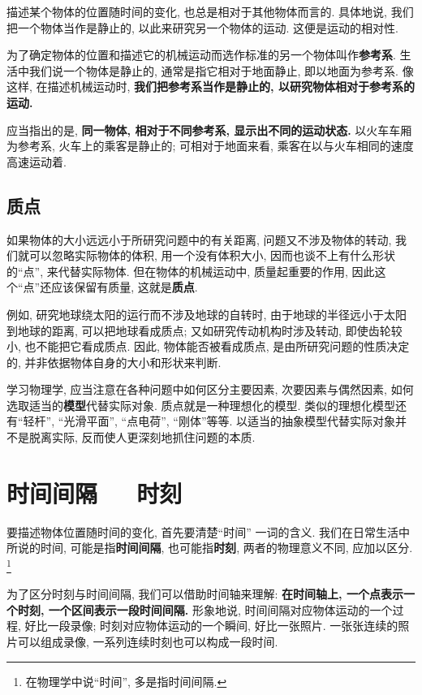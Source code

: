 \documentclass[11pt,a4paper]{ctexbook}
\newcommand{\bre}{\ \ \ }
\begin{document}
描述某个物体的位置随时间的变化, 也总是相对于其他物体而言的. 具体地说,
我们把一个物体当作是静止的, 以此来研究另一个物体的运动. 这便是运动的相对性.

为了确定物体的位置和描述它的机械运动而选作标准的另一个物体叫作\textbf{参考系}.
生活中我们说一个物体是静止的, 通常是指它相对于地面静止, 即以地面为参考系.
像这样, 在描述机械运动时, \textbf{我们把参考系当作是静止的, 以研究物体相对于参考系的运动.}

应当指出的是, \textbf{同一物体, 相对于不同参考系, 显示出不同的运动状态.}
以火车车厢为参考系, 火车上的乘客是静止的; 可相对于地面来看, 乘客在以与火车相同的速度高速运动着.

\subsection{质点}

如果物体的大小远远小于所研究问题中的有关距离, 问题又不涉及物体的转动,
我们就可以忽略实际物体的体积, 用一个没有体积大小, 因而也谈不上有什么形状的``点'', 来代替实际物体.
但在物体的机械运动中, 质量起重要的作用, 因此这个``点''还应该保留有质量, 这就是\textbf{质点}.

例如, 研究地球绕太阳的运行而不涉及地球的自转时, 由于地球的半径远小于太阳到地球的距离, 可以把地球看成质点;
又如研究传动机构时涉及转动, 即使齿轮较小, 也不能把它看成质点.
因此, 物体能否被看成质点, 是由所研究问题的性质决定的, 并非依据物体自身的大小和形状来判断.

学习物理学, 应当注意在各种问题中如何区分主要因素, 次要因素与偶然因素, 如何选取适当的\textbf{模型}代替实际对象. 质点就是一种理想化的模型.
类似的理想化模型还有``轻杆'', ``光滑平面'', ``点电荷'', ``刚体''等等. 以适当的抽象模型代替实际对象并不是脱离实际, 反而使人更深刻地抓住问题的本质.

\section{时间间隔\bre 时刻}

要描述物体位置随时间的变化, 首先要清楚``时间''
一词的含义.
我们在日常生活中所说的时间, 可能是指\textbf{时间间隔}, 也可能指\textbf{时刻},
两者的物理意义不同, 应加以区分. \footnote{在物理学中说``时间'', 多是指时间间隔.}

为了区分时刻与时间间隔, 我们可以借助时间轴来理解: \textbf{在时间轴上,
一个点表示一个时刻, 一个区间表示一段时间间隔. }形象地说,
时间间隔对应物体运动的一个过程, 好比一段录像;
时刻对应物体运动的一个瞬间, 好比一张照片. 一张张连续的照片可以组成录像,
一系列连续时刻也可以构成一段时间.
\end{document}
